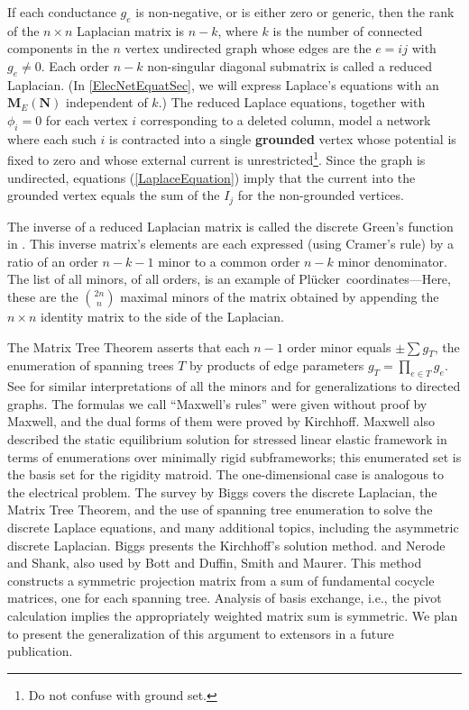 \documentclass[12pt]{article}
\theoremstyle{definition}
\newcommand{\ext}[1]{\ensuremath{\mathbf{#1}}}
\newcommand{\Plucker}{Pl\"{u}cker\ }
\begin{document}
If each  conductance $g_{e}$ is non-negative, 
or is either zero
or generic, then the rank of 
the $n\times n$ Laplacian matrix is $n-k$, 
where $k$ is the number of connected components in the $n$
vertex undirected graph whose edges
are the $e=ij$ with $g_{e}\neq 0$.  Each order $n-k$ non-singular
diagonal submatrix is called a reduced Laplacian.  
(In \textsection \ref{ElecNetEquatSec}, we will express Laplace's equations
with an $\ext{M}_E(\ext{N})$ independent of $k$.) 
The reduced Laplace 
equations, together with $\phi_i=0$ for each vertex $i$ corresponding
to a deleted column, model a network where each such $i$ is 
contracted into a single 
\textbf{grounded} vertex
whose potential is fixed to zero and whose 
external current is 
unrestricted\footnote{Do not confuse with ground set.}.  
Since the graph is undirected, equations (\ref{LaplaceEquation})
imply that the current into the grounded vertex equals
the sum of the $I_j$ for the non-grounded vertices.

The inverse of a reduced Laplacian matrix is called the
discrete Green's function in \cite{ChungYaoGreens}.
This inverse matrix's elements are each expressed (using Cramer's rule)
by a ratio of an order $n-k-1$ minor to a common order $n-k$ minor
denominator.
The %
list of all minors, of all orders,
is an example of \Plucker coordinates---Here, these are the 
$\binom{2n}{n}$ maximal minors of the matrix obtained by appending
the $n\times n$ identity matrix to the side of the Laplacian.

The Matrix Tree Theorem asserts that each $n-1$ order minor 
equals $\pm\sum g_T$, the enumeration of spanning trees $T$ by products
of edge parameters $g_T=\prod_{e \in T}g_e$.  
See \cite{sdcMTT} for 
similar interpretations of all the minors and 
for generalizations to directed graphs.
The formulas we call ``Maxwell's rules'' were given without
proof by Maxwell\cite{MaxR}, and the dual forms of them were proved
by Kirchhoff\cite{Kirchhoff}.
Maxwell also described the static equilibrium solution for 
stressed linear elastic
framework in terms of enumerations over minimally rigid 
subframeworks\cite{MaxwellsFramesPaper}; this enumerated set is the basis
set for the rigidity matroid\cite{RigidityBook}.  The one-dimensional case
is analogous to the electrical problem.
The survey by Biggs \cite{BiggsAlgPotTheory}
covers the discrete Laplacian, the Matrix Tree Theorem, and the
use of spanning tree enumeration to solve the discrete Laplace equations, and
many additional topics, including the asymmetric discrete Laplacian.
Biggs presents the Kirchhoff's solution method.
and Nerode and Shank\cite{NerodeShank}, also used by 
Bott and Duffin\cite{BottDuffinAlgNetworks}, Smith\cite{SmithElec}
and Maurer\cite{Maurer76}.
This method constructs a symmetric projection matrix from a sum of fundamental
cocycle matrices, one for each spanning tree.  Analysis of basis exchange,
i.e., the pivot calculation
implies the appropriately weighted matrix sum is symmetric.  We plan to present
the generalization of this argument to extensors in a future publication.
\end{document}

